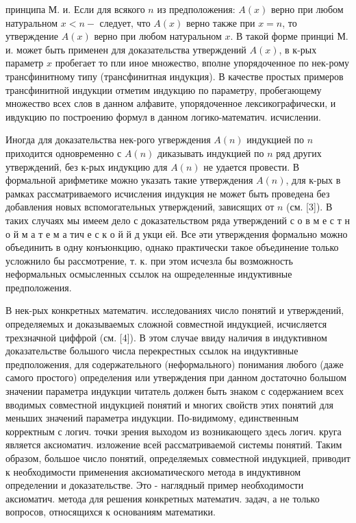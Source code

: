 \documentclass[10pt]{article}
\begin{document}
принципа М. и. Если для всякого $n$ из предположения: $A(x)$ верно при любом натуральном $x<n-$ следует, что $A(x)$ верно также при $x=n$, то утверждение $A(x)$ верно при любом натуральном $x$. В такой форме принциі М. и. может быть применен для доказательства утверждений $A(x)$, в к-рых параметр $x$ пробегает то пли иное множество, вполне упорядоченное по нек-рому трансфинитному типу (трансфинитная индукция). В качестве простых примеров трансфинитной индукции отметим индукцию по параметру, пробегающему множество всех слов в данном алфавите, упорядоченное лексикографически, и ивдукцию по построению формул в данном логико-математич. исчислении.



Иногда для доказательства нек-рого угверждения $A(n)$ индукцией по $n$ приходится одновременно с $A(n)$ диказывать индукцией по $n$ ряд других утверждений, без к-рых индукцию для $A(n)$ не удается провести. В формальной арифметике можно указать такие утверждения $A(n)$, для к-рых в рамках рассматриваемого исчисления индукция не может быть проведена без добавления новых вспомогательных утверждений, зависящих от $n$ (см. [3]). В таких случаях мы имеем дело с доказательством ряда утверждений с о в м е с т н о й м а т е м а тич е с к о й й д укци ей. Все әти утверждения формально можно объединить в одну конъюнкцию, однако практически такое объединение только усложнило бы рассмотрение, т. к. при этом исчезла бы возможность неформальных осмысленных ссылок на ошределенные индуктивные предположения.



В нек-рых конкретных математич. исследованиях число понятий и утверждений, определяемых и доказываемых сложной совместной индукцией, исчисляется трехзначной циффрой (см. [4]). В этом случае ввиду наличия в индуктивном доказательстве большого числа перекрестных ссылок на индуктивные предположения, для содержательного (неформального) понимания любого (даже самого простого) определения или утверждения при данном достаточно большом значении параметра индукции читатель должен быть знаком с содержанием всех вводимых совместной индукцией понятий и многих свойств этих понятий для меньших значений параметра индукции. По-видимому, единственным корректным с логич. точки зрения выходом из возникающего здесь логич. круга является аксиоматич. изложение всей рассматриваемой системы понятий. Таким образом, большое число понятий, определяемых совместной индукцией, приводит к необходимости применения аксиоматического метода в индуктивном определении и доказательстве. Это - наглядный пример необходимости аксиоматич. метода для решения конкретных математич. задач, а не только вопросов, относящихся $к$ основаниям математики.
\end{document}
